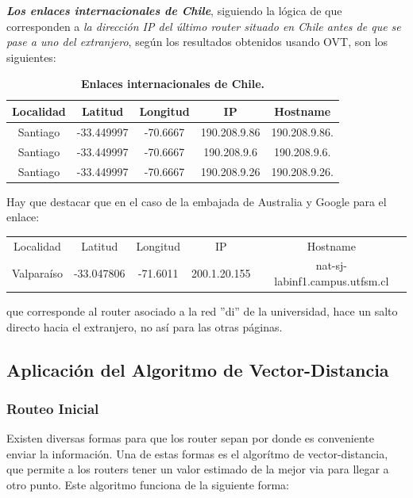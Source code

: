 \documentclass[12pt]{article}
\begin{document}
\textbf{\textit{Los enlaces internacionales de Chile}}, siguiendo la lógica de que corresponden a \emph{la dirección IP del último router situado en Chile antes de que se pase a uno del extranjero}, según los resultados obtenidos usando OVT, son los siguientes:

\begin{table}[H]
\centering
\begin{tabular}{| c | c | c | c | c |}
\hline
Localidad & Latitud & Longitud & IP & Hostname\\
\hline
Santiago & -33.449997 & -70.6667 & 190.208.9.86 & 190.208.9.86.\\
\hline
Santiago & -33.449997 & -70.6667 & 190.208.9.6 & 190.208.9.6.\\
\hline
Santiago & -33.449997 & -70.6667 & 190.208.9.26 & 190.208.9.26.\\
\hline
\end{tabular}
\caption{\small \textbf{Enlaces internacionales de Chile.}}
\end{table}

Hay que destacar que en el caso de la embajada de Australia y Google para el enlace:

\begin{table}[H]
\centering
\begin{tabular}{ c  c  c  c  c }
Localidad & Latitud & Longitud & IP & Hostname\\
Valparaíso & -33.047806 & -71.6011 & 200.1.20.155 & nat-sj-labinf1.campus.utfsm.cl\\
\end{tabular}
\end{table}

que corresponde al router asociado a la red ''di'' de la universidad, hace un salto directo hacia el extranjero, no así para las otras páginas.

\newpage

\subsection{Aplicación del Algoritmo de Vector-Distancia}
\subsubsection{Routeo Inicial}
Existen diversas formas para que los router sepan por donde es conveniente enviar la información. Una de estas formas es el algorítmo de vector-distancia, que permite a los routers tener un valor estimado de la mejor via para llegar a otro punto. Este algoritmo funciona de la siguiente forma:\\
	
\end{document}
